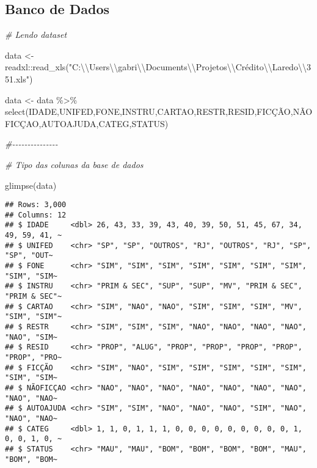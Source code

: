 \documentclass[
]{book}
\newenvironment{Shaded}{\begin{snugshade}}{\end{snugshade}}
\newcommand{\CommentTok}[1]{\textcolor[rgb]{0.56,0.35,0.01}{\textit{#1}}}
\newcommand{\FunctionTok}[1]{\textcolor[rgb]{0.00,0.00,0.00}{#1}}
\newcommand{\NormalTok}[1]{#1}
\newcommand{\OtherTok}[1]{\textcolor[rgb]{0.56,0.35,0.01}{#1}}
\newcommand{\SpecialCharTok}[1]{\textcolor[rgb]{0.00,0.00,0.00}{#1}}
\newcommand{\StringTok}[1]{\textcolor[rgb]{0.31,0.60,0.02}{#1}}
\begin{document}
\hypertarget{banco-de-dados}{%
\subsection{Banco de Dados}\label{banco-de-dados}}

\begin{Shaded}
\begin{Highlighting}[]
\CommentTok{\# Lendo dataset}

\NormalTok{data }\OtherTok{\textless{}{-}}\NormalTok{ readxl}\SpecialCharTok{::}\FunctionTok{read\_xls}\NormalTok{(}\StringTok{"C:}\SpecialCharTok{\textbackslash{}\textbackslash{}}\StringTok{Users}\SpecialCharTok{\textbackslash{}\textbackslash{}}\StringTok{gabri}\SpecialCharTok{\textbackslash{}\textbackslash{}}\StringTok{Documents}\SpecialCharTok{\textbackslash{}\textbackslash{}}\StringTok{Projetos}\SpecialCharTok{\textbackslash{}\textbackslash{}}\StringTok{Crédito}\SpecialCharTok{\textbackslash{}\textbackslash{}}\StringTok{Laredo}\SpecialCharTok{\textbackslash{}\textbackslash{}}\StringTok{351.xls"}\NormalTok{)}

\NormalTok{data }\OtherTok{\textless{}{-}}\NormalTok{ data }\SpecialCharTok{\%\textgreater{}\%}
\FunctionTok{select}\NormalTok{(IDADE,UNIFED,FONE,INSTRU,CARTAO,RESTR,RESID,FICÇÃO,NÃOFICÇAO,AUTOAJUDA,CATEG,STATUS)}

\CommentTok{\#{-}{-}{-}{-}{-}{-}{-}{-}{-}{-}{-}{-}{-}{-}{-}}

\CommentTok{\# Tipo das colunas da base de dados}

\FunctionTok{glimpse}\NormalTok{(data)}
\end{Highlighting}
\end{Shaded}

\begin{verbatim}
## Rows: 3,000
## Columns: 12
## $ IDADE     <dbl> 26, 43, 33, 39, 43, 40, 39, 50, 51, 45, 67, 34, 49, 59, 41, ~
## $ UNIFED    <chr> "SP", "SP", "OUTROS", "RJ", "OUTROS", "RJ", "SP", "SP", "OUT~
## $ FONE      <chr> "SIM", "SIM", "SIM", "SIM", "SIM", "SIM", "SIM", "SIM", "SIM~
## $ INSTRU    <chr> "PRIM & SEC", "SUP", "SUP", "MV", "PRIM & SEC", "PRIM & SEC"~
## $ CARTAO    <chr> "SIM", "NAO", "NAO", "SIM", "SIM", "SIM", "MV", "SIM", "SIM"~
## $ RESTR     <chr> "SIM", "SIM", "SIM", "NAO", "NAO", "NAO", "NAO", "NAO", "SIM~
## $ RESID     <chr> "PROP", "ALUG", "PROP", "PROP", "PROP", "PROP", "PROP", "PRO~
## $ FICÇÃO    <chr> "SIM", "NAO", "SIM", "SIM", "SIM", "SIM", "SIM", "SIM", "SIM~
## $ NÃOFICÇAO <chr> "NAO", "NAO", "NAO", "NAO", "NAO", "NAO", "NAO", "NAO", "NAO~
## $ AUTOAJUDA <chr> "SIM", "SIM", "NAO", "NAO", "NAO", "SIM", "NAO", "NAO", "NAO~
## $ CATEG     <dbl> 1, 1, 0, 1, 1, 1, 0, 0, 0, 0, 0, 0, 0, 0, 0, 1, 0, 0, 1, 0, ~
## $ STATUS    <chr> "MAU", "MAU", "BOM", "BOM", "BOM", "BOM", "MAU", "BOM", "BOM~
\end{verbatim}

  
\end{document}
